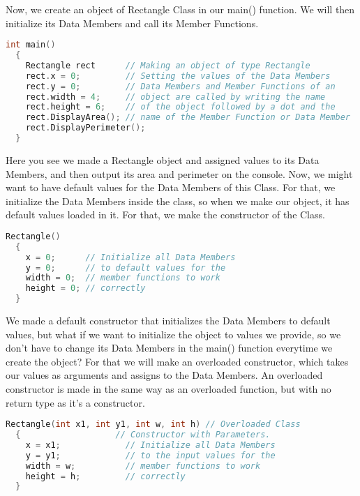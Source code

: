\documentclass[11pt,fleqn]{book} %
\begin{document}
Now, we create an object of Rectangle Class in our main() function. We will then initialize its Data Members and call its Member Functions.

\begin{lstlisting}[language=C++, caption=Making an Object using the Class and using its Data Members and Functions]
  int main()
  {
    Rectangle rect      // Making an object of type Rectangle
    rect.x = 0;         // Setting the values of the Data Members
    rect.y = 0;         // Data Members and Member Functions of an
    rect.width = 4;     // object are called by writing the name 
    rect.height = 6;    // of the object followed by a dot and the  
    rect.DisplayArea(); // name of the Member Function or Data Member
    rect.DisplayPerimeter();
  }
\end{lstlisting}

Here you see we made a Rectangle object and assigned values to its Data Members, and then output its area and perimeter on the console. Now, we might want to have default values for the Data Members of this Class. For that, we initialize the Data Members inside the class, so when we make our object, it has default values loaded in it. For that, we make the constructor of the Class.

\begin{lstlisting}[language=C++, caption={Default Class Constructor, to be defined inside the Class Body}]
  Rectangle()
  {
    x = 0;      // Initialize all Data Members
    y = 0;      // to default values for the 
    width = 0;  // member functions to work
    height = 0; // correctly
  }
\end{lstlisting}


We made a default constructor that initializes the Data Members to default values, but what if we want to initialize the object to values we provide, so we don't have to change its Data Members in the main() function everytime we create the object? For that we will make an overloaded constructor, which takes our values as arguments and assigns to the Data Members. An overloaded constructor is made in the same way as an overloaded function, but with no return type as it's a constructor.

\begin{lstlisting}[language=C++, caption={Overloaded Constructor, to be defined inside the Class Body}]
  Rectangle(int x1, int y1, int w, int h) // Overloaded Class  
  {                   // Constructor with Parameters.
    x = x1;             // Initialize all Data Members
    y = y1;             // to the input values for the 
    width = w;          // member functions to work
    height = h;         // correctly
  }
\end{lstlisting}
\end{document}
